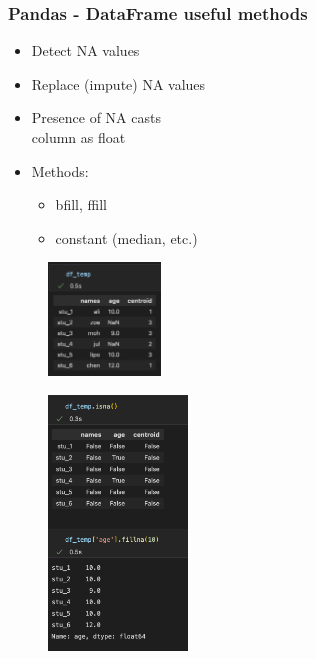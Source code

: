 \begin{frame}\frametitle{Pandas - DataFrame useful methods}
   \begin{minipage}{0.58\linewidth}
      \begin{itemize}
         \item Detect NA values
         \item Replace (impute) NA values
         \item Presence of NA casts\\column as float
         \item Methods:
         \begin{itemize}
            \item bfill, ffill
            \item constant (median, etc.)
         \end{itemize}
      \end{itemize}
      \vspace{.5cm}
      \begin{figure}[H]
         \includegraphics[width=3cm]{../images/illustrations/pandas_df_with_na.png}
      \end{figure}
   \end{minipage}
   \begin{minipage}{0.38\linewidth}
      \begin{figure}[H]
         \includegraphics[width=3.7cm]{../images/illustrations/pandas_isna_fillna.png}
      \end{figure}
   \end{minipage}
\end{frame}



